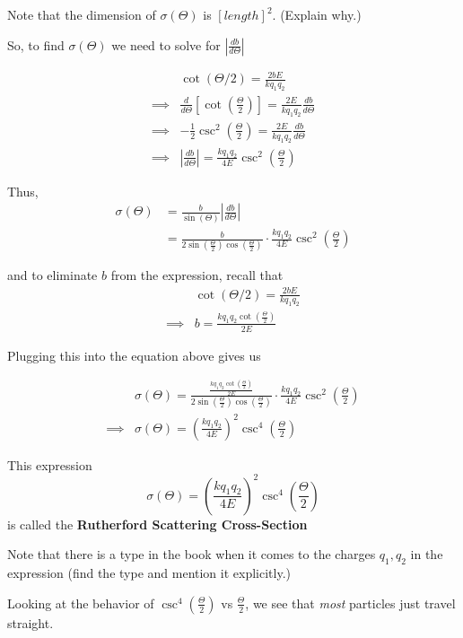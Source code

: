 \documentclass[11pt]{article}
\begin{document}
\vskip 0.5cm
\begin{thought}
  {Note that the dimension of $\sigma\left(\Theta\right)$ is $[length]^2$.} (Explain why.)
\end{thought}

\vskip 0.5cm
So, to find $\sigma\left(\Theta\right)$ we need to solve for $\left| \frac{db}{d\Theta} \right|$

\begin{align*}
  &\cot\left(\Theta/2\right) = \frac{2bE}{k q_1 q_2} \\
  \implies& \frac{d}{d\Theta} \left[ \cot \left(\frac{\Theta}{2}\right) \right] = \frac{2E}{k q_1 q_2} \frac{db}{d\Theta} \\
  \implies& -\frac{1}{2}\csc^2\left(\frac{\Theta}{2}\right) = \frac{2E}{k q_1 q_2} \frac{db}{d\Theta} \\
  \implies& \left| \frac{db}{d\Theta} \right| = \frac{k q_1 q_2}{4E} \csc^2 \left(\frac{\Theta}{2}\right)
\end{align*}

Thus,
\begin{align*}
  \sigma\left(\Theta\right) &= \frac{b}{\sin\left(\Theta\right)} \left| \frac{db}{d\Theta} \right| \\
  &= \frac{b}{2\sin\left(\frac{\Theta}{2}\right)\cos\left(\frac{\Theta}{2}\right)} \cdot \frac{k q_1 q_2}{4E} \csc^2 \left(\frac{\Theta}{2}\right) 
\end{align*}

and to eliminate $b$ from the expression, recall that 
\begin{align*}
  &\cot(\Theta/2) = \frac{2b E}{k q_1 q_2} \\
  \implies& b = \frac{k q_1 q_2 \cot\left(\frac{\Theta}{2}\right)}{2E}
\end{align*}

Plugging this into the equation above gives us 

\begin{align*}
  &\sigma\left(\Theta\right) =  \frac{\frac{k q_1 q_2 \cot\left(\frac{\Theta}{2}\right)}{2E} }{2\sin\left(\frac{\Theta}{2}\right)\cos\left(\frac{\Theta}{2}\right)} \cdot \frac{k q_1 q_2}{4E} \csc^2 \left(\frac{\Theta}{2}\right) \\
  \implies& \boxed{\sigma \left(\Theta\right) = \left(\frac{k q_1 q_2}{4E}\right)^2 \csc^4 \left( \frac{\Theta}{2} \right) }
\end{align*}

\begin{bluebox}
  This expression 
  \[ \sigma \left(\Theta\right) = \left(\frac{k q_1 q_2}{4E}\right)^2 \csc^4 \left( \frac{\Theta}{2} \right)  \]
  is called the \textbf{Rutherford Scattering Cross-Section}
\end{bluebox}

\begin{redbox}
  Note that there is a type in the book when it comes to the charges $q_1, q_2$ in the expression (find the type and mention it explicitly.)
\end{redbox}

\vskip 0.5cm
Looking at the behavior of $\csc^4 \left(\frac{\Theta}{2}\right)$ vs $\frac{\Theta}{2}$, we see that \emph{most} particles just travel straight.
\end{document}
